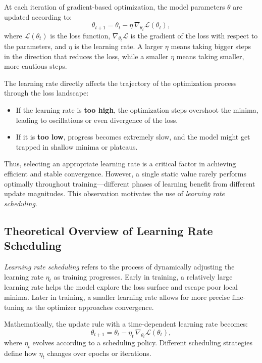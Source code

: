 \documentclass[12pt,a4paper]{report}
\begin{document}
\vspace{0.5em}
At each iteration of gradient-based optimization, the model parameters $\theta$ are updated according to:
\[
\theta_{t+1} = \theta_t - \eta \, \nabla_{\theta_t}\mathcal{L}(\theta_t),
\]
where $\mathcal{L}(\theta_t)$ is the loss function, $\nabla_{\theta_t}\mathcal{L}$ is the gradient of the loss with respect to the parameters, and $\eta$ is the learning rate.  
A larger $\eta$ means taking bigger steps in the direction that reduces the loss, while a smaller $\eta$ means taking smaller, more cautious steps.

\vspace{0.5em}
The learning rate directly affects the trajectory of the optimization process through the loss landscape:
\begin{itemize}
    \item If the learning rate is \textbf{too high}, the optimization steps overshoot the minima, leading to oscillations or even divergence of the loss.
    \item If it is \textbf{too low}, progress becomes extremely slow, and the model might get trapped in shallow minima or plateaus.
\end{itemize}

Thus, selecting an appropriate learning rate is a critical factor in achieving efficient and stable convergence.  
However, a single static value rarely performs optimally throughout training—different phases of learning benefit from different update magnitudes.  
This observation motivates the use of \textit{learning rate scheduling}.

\vspace{1em}
\subsection{Theoretical Overview of Learning Rate Scheduling}

\textit{Learning rate scheduling} refers to the process of dynamically adjusting the learning rate $\eta_t$ as training progresses.  
Early in training, a relatively large learning rate helps the model explore the loss surface and escape poor local minima.  
Later in training, a smaller learning rate allows for more precise fine-tuning as the optimizer approaches convergence.

\vspace{0.5em}
Mathematically, the update rule with a time-dependent learning rate becomes:
\[
\theta_{t+1} = \theta_t - \eta_t \, \nabla_{\theta_t}\mathcal{L}(\theta_t),
\]
where $\eta_t$ evolves according to a scheduling policy.  
Different scheduling strategies define how $\eta_t$ changes over epochs or iterations.
\end{document}
